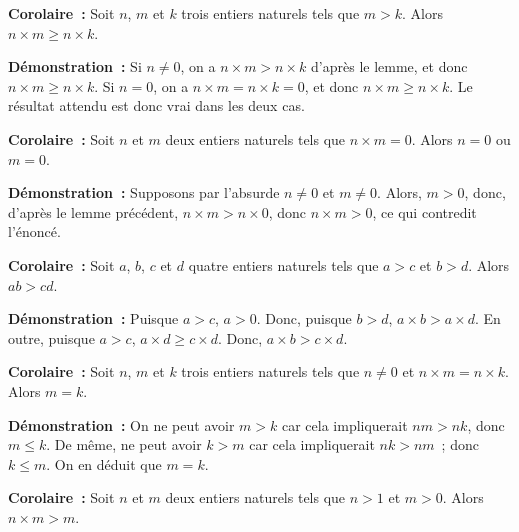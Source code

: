 \noindent\textbf{Corolaire :} Soit $n$, $m$ et $k$ trois entiers naturels tels que $m > k$. 
                               Alors $n \times m \geq n \times k$.

\medskip

\noindent\textbf{Démonstration :} Si $n \neq 0$, on a $n \times m > n \times k$ d'après le lemme, et donc $n \times m \geq n \times k$.
    Si $n = 0$, on a $n \times m = n \times k= 0$, et donc $n \times m \geq n \times k$. 
    Le résultat attendu est donc vrai dans les deux cas.

   \done 

\medskip

\noindent\textbf{Corolaire :} Soit $n$ et $m$ deux entiers naturels tels que $n \times m = 0$. Alors $n = 0$ ou $m = 0$. 

\medskip

\noindent\textbf{Démonstration :} Supposons par l'absurde $n \neq 0$ et $m \neq 0$.
    Alors, $m > 0$, donc, d'après le lemme précédent, $n \times m > n \times 0$, donc $n \times m > 0$, ce qui contredit l'énoncé.

   \done 

\medskip

\noindent\textbf{Corolaire :} Soit $a$, $b$, $c$ et $d$ quatre entiers naturels tels que $a > c$ et $b > d$. 
    Alors $a b > c d$.

\medskip

\noindent\textbf{Démonstration :} Puisque $a > c$, $a > 0$.
    Donc, puisque $b > d$, $a \times b > a \times d$. 
    En outre, puisque $a > c$, $a \times d \geq c \times d$.
    Donc, $a \times b > c \times d$.

   \done 

\medskip

\noindent\textbf{Corolaire :} Soit $n$, $m$ et $k$ trois entiers naturels tels que $n \neq 0$ et $n \times m = n \times k$. 
    Alors $m = k$.

\medskip

\noindent\textbf{Démonstration :} On ne peut avoir $m > k$ car cela impliquerait $n m > n k$, donc $m \leq k$.
   De même, ne peut avoir $k > m$ car cela impliquerait $n k > n m$ ; donc $k \leq m$. 
   On en déduit que $m = k$.

  \done 

\medskip

\noindent\textbf{Corolaire :} Soit $n$ et $m$ deux entiers naturels tels que $n > 1$ et $m > 0$. 
    Alors $n \times m > m$.

\medskip

